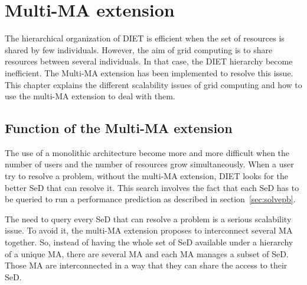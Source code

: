 
\chapter{Multi-MA extension}
\label{ch:multiMAextension}

The hierarchical organization of DIET is efficient when the set of resources is
shared by few individuals. However, the aim of grid computing is to share
resources between several individuals. In that case, the DIET hierarchy become
inefficient. The Multi-MA extension has been implemented to resolve this
issue. This chapter explains the different scalability issues of grid computing
and how to use the multi-MA extension to deal with them.

\section{Function of the Multi-MA extension}

The use of a monolithic architecture become more and more difficult when the
number of users and the number of resources grow simultaneously. When a user
try to resolve a problem, without the multi-MA extension, DIET looks for the
better SeD that can resolve it. This search involves the fact that each SeD has
to be queried to run a performance prediction as described in
section~\ref{sec:solvepb}.

The need to query every SeD that can resolve a problem is a serious
scalability issue. To avoid it, the multi-MA extension proposes to interconnect
several MA together. So, instead of having the whole set of SeD available under
a hierarchy of a unique MA, there are several MA and each MA manages a
subset of SeD. Those MA are interconnected in a way that they can share the
access to their SeD.

